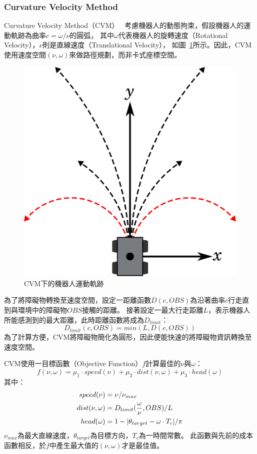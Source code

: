 \subsubsection{Curvature Velocity Method}
Curvature Velocity Method（CVM）~\cite{Simmons:1996:CVM}
考慮機器人的動態拘束，假設機器人的運動軌跡為曲率$c=\omega/\nu$的圓弧，
其中$\omega$代表機器人的旋轉速度（Rotational Velocity），$\nu$則是直線速度（Translational Velocity），
如圖~\ref{f:cvm_curvature}所示。因此，CVM使用速度空間$(\nu,\omega)$來做路徑規劃，而非卡式座標空間。
\begin{figure}[h!]
	\centering
	\includegraphics[width=.6\textwidth]{figures/algorithm/CVM1}
	\caption{CVM下的機器人運動軌跡}
	\label{f:cvm_curvature}
\end{figure}

為了將障礙物轉換至速度空間，設定一距離函數$D(c,OBS)$為沿著曲率$c$行走直到與環境中的障礙物$OBS$接觸的距離。
接著設定一最大行走距離$L$，表示機器人所能感測到的最大距離，此時距離函數將成為$D_{limit}$：
\begin{equation}
	D_{limit}(c,OBS) = min(L,D(c,OBS))
\end{equation}
為了計算方便，CVM將障礙物簡化為圓形，因此便能快速的將障礙物資訊轉換至速度空間。

CVM使用一目標函數（Objective Function）$f$計算最佳的$\nu$與$\omega$：
\begin{equation}
	f(\nu,\omega) = \mu_1 \cdot speed(\nu) + \mu_2 \cdot dist(\nu,\omega) + \mu_3 \cdot head(\omega)
\end{equation}
其中：
\begin{align*}
	speed(\nu)	&= \nu / \nu_{max} \\ 
	dist(\nu,\omega)	&= D_{limit}({\omega \over \nu},OBS) / L \\
	head(\omega)	&= 1 - |\theta_{target} - \omega \cdot T_{c} | / \pi \\
\end{align*}
$\nu_{max}$為最大直線速度，$\theta_{target}$為目標方向，$T_c$為一時間常數。
此函數與先前的成本函數相反，於$f$中產生最大值的$(\nu,\omega)$才是最佳值。

